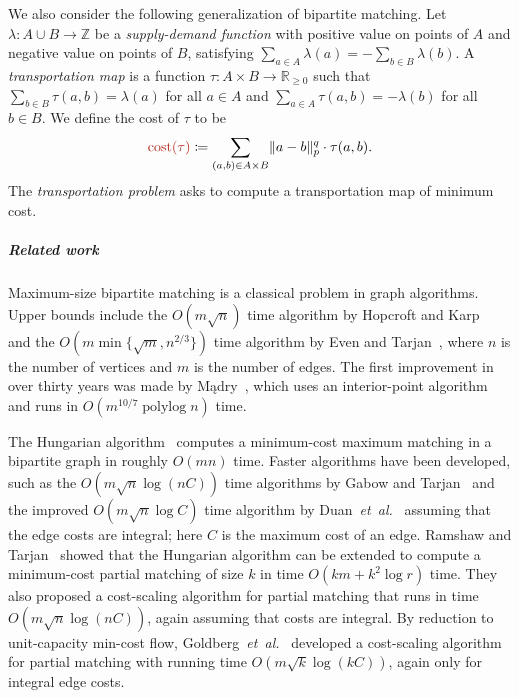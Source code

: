 \documentclass[a4paper,UKenglish]{socg-lipics-v2018}
\makeatletter
\def\etal{\emph{et~al.}}
\def\etal{\textit{et~al.}}
\def\polylog{\mathop{\mathrm{polylog}}}
\def\reals{\mathbb{R}}
\def\ints{\mathbb{Z}}
\def\abs#1{\mathopen| #1 \mathclose|}		%
\def\norm#1{\mathopen\| #1 \mathclose\|}	%
\def\tsupply{\lambda}
\def\cost{\operatorname{cost}}
\theoremstyle{plain}
\numberwithin{figure}{section}
\renewcommand{\paragraph}{\subparagraph}
\def\EMPH#1{\textcolor{BrickRed}{{\emph{#1}}}}
\def\n@te#1{\textsf{\boldmath \textbf{$\langle\!\langle$#1$\rangle\!\rangle$}}\leavevmode}
\def\note#1{\textcolor{red}{\n@te{#1}}}
\makeatother
\begin{document}
We also consider the following generalization of bipartite matching.
Let $\tsupply:A \cup B \to \ints$ be a \EMPH{supply-demand function} with
positive value on points of $A$ and negative value on points of $B$, satisfying
$\sum_{a \in A} \tsupply(a) = - \sum_{b \in B} \tsupply(b)$.
A \EMPH{transportation map} is a function $\tau: A \times B \to \reals_{\geq 0}$
such that $\sum_{b \in B} \tau(a, b) = \tsupply(a)$ for all $a \in A$ and
$\sum_{a \in A} \tau(a, b) = -\tsupply(b)$ for all $b \in B$.
We define the cost of $\tau$ to be
\begin{equation*}
	\EMPH{$\cost(\tau)$} \coloneqq \sum_{(a, b) \in A \times B} \norm{a-b}_p^q \cdot \tau(a, b).
\end{equation*}
The \EMPH{transportation problem} asks to compute a transportation map of minimum cost.


\paragraph{Related work}
Maximum-size bipartite matching is a classical problem in graph algorithms.
Upper bounds include the $O(m\sqrt{n})$ time algorithm by
Hopcroft and Karp~\cite{HK73} and the $O(m \min\{\sqrt{m}, n^{2/3}\})$ time
algorithm by Even and Tarjan~\cite{ET75}, where $n$ is the
number of vertices and $m$ is the number of edges.
The first improvement in over thirty years was made by M{\k a}dry~\cite{M13},
which uses an interior-point algorithm and runs in $O(m^{10/7}\polylog n)$ time.

The Hungarian algorithm~\cite{Kuhn55} computes a minimum-cost maximum matching
in a bipartite graph in roughly $O(mn)$ time.
Faster algorithms have been developed,
such as the $O(m\sqrt{n}\log(nC))$ time algorithms by Gabow and
Tarjan~\cite{GT89} and the improved $O(m\sqrt{n}\log C)$ time algorithm by
Duan~\etal~\cite{DPS11} assuming that the edge costs are integral;
here $C$ is the maximum cost of an edge.
Ramshaw and Tarjan~\cite{RT12} showed that the Hungarian algorithm can be extended to compute a minimum-cost partial
matching of size $k$ in time $O(km + k^2\log r)$ time.
They also proposed a cost-scaling algorithm for partial
matching that runs in time $O(m\sqrt{n}\log(nC))$, again assuming that costs
are integral.
By reduction to unit-capacity min-cost flow, Goldberg~\etal~\cite{GHKT17}
developed a cost-scaling algorithm for partial matching with running time
$O(m\sqrt{k}\log(kC))$,
again only for integral edge costs.
\end{document}
